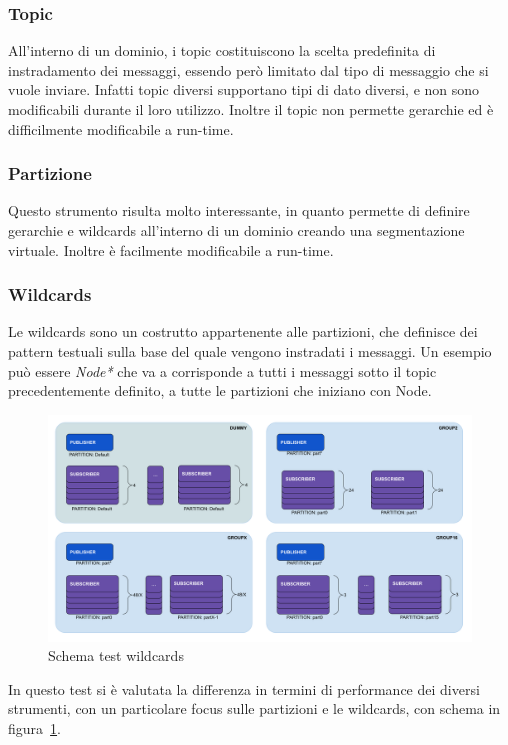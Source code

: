 \subsubsection{Topic}
All'interno di un dominio, i topic costituiscono la scelta predefinita di instradamento dei messaggi, essendo però limitato dal tipo di messaggio che si vuole inviare. Infatti topic diversi supportano tipi di dato diversi, e non sono modificabili durante il loro utilizzo.
Inoltre il topic non permette gerarchie ed è difficilmente modificabile a run-time.

\subsubsection{Partizione}
Questo strumento risulta molto interessante, in quanto permette di definire gerarchie e wildcards all'interno di un dominio creando una segmentazione virtuale. Inoltre è facilmente modificabile a run-time.

\subsubsection{Wildcards}
Le wildcards sono un costrutto appartenente alle partizioni, che definisce dei pattern testuali sulla base del quale vengono instradati i messaggi. Un esempio può essere \textit{Node*} che va a corrisponde a tutti i messaggi sotto il topic precedentemente definito, a tutte le partizioni che iniziano con Node.

\begin{figure}[H]
    \includegraphics[width=\textwidth]{./img/wildcards.png}
    \caption{Schema test wildcards}\label{fig:test_UML_wildcards}
\end{figure} 

In questo test si è valutata la differenza in termini di performance dei diversi strumenti, con un particolare focus sulle partizioni e le wildcards, con schema in figura~\ref{fig:test_UML_wildcards}.

